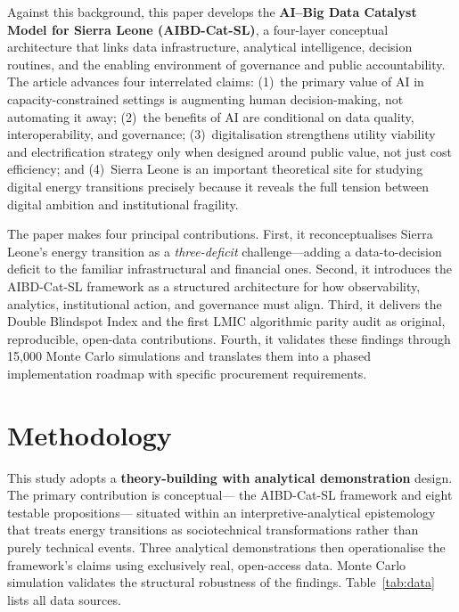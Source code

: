 \documentclass[preprint,12pt]{elsarticle}
\begin{document}
Against this background, this paper develops the
\textbf{AI--Big Data Catalyst Model for Sierra Leone (AIBD-Cat-SL)},
a four-layer conceptual architecture that links data infrastructure,
analytical intelligence, decision routines, and the enabling
environment of governance and public accountability. The article
advances four interrelated claims: (1)~the primary value of AI
in capacity-constrained settings is augmenting human
decision-making, not automating it away; (2)~the benefits of
AI are conditional on data quality, interoperability, and
governance; (3)~digitalisation strengthens utility viability
and electrification strategy only when designed around public
value, not just cost efficiency; and (4)~Sierra Leone is an
important theoretical site for studying digital energy transitions
precisely because it reveals the full tension between digital
ambition and institutional fragility.

The paper makes four principal contributions. First, it
reconceptualises Sierra Leone's energy transition as a
\textit{three-deficit} challenge---adding a data-to-decision
deficit to the familiar infrastructural and financial ones.
Second, it introduces the AIBD-Cat-SL framework as a structured
architecture for how observability, analytics, institutional
action, and governance must align. Third, it delivers the
Double Blindspot Index and the first LMIC algorithmic parity
audit as original, reproducible, open-data contributions.
Fourth, it validates these findings through 15,000 Monte Carlo
simulations and translates them into a phased implementation
roadmap with specific procurement requirements.

\section{Methodology}
\label{sec:method}

This study adopts a \textbf{theory-building with analytical
demonstration} design. The primary contribution is conceptual---
the AIBD-Cat-SL framework and eight testable propositions---
situated within an interpretive-analytical epistemology that
treats energy transitions as sociotechnical transformations rather
than purely technical events. Three analytical demonstrations
then operationalise the framework's claims using exclusively real,
open-access data. Monte Carlo simulation validates the structural
robustness of the findings. Table~\ref{tab:data} lists all
data sources.
\end{document}
